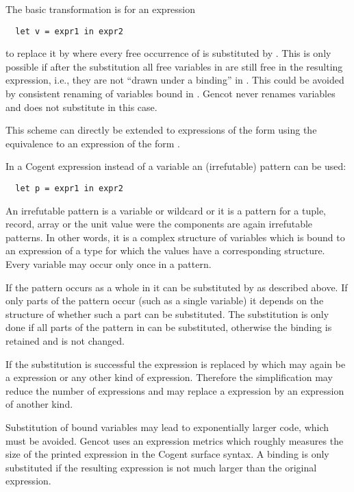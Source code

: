 The basic transformation is for an expression
\begin{verbatim}
  let v = expr1 in expr2
\end{verbatim}
to replace it by  where every free occurrence of  is substituted by . This is only 
possible if after the substitution all free variables in  are still free in the resulting expression, i.e., 
they are not ``drawn under a binding'' in . This could be avoided by consistent renaming of variables bound in 
. Gencot never renames variables and does not substitute in this case.

This scheme can directly be extended to expressions of the form  using the
equivalence to an expression of the form .

In a Cogent  expression instead of a variable  an (irrefutable) pattern  can be used:
\begin{verbatim}
  let p = expr1 in expr2
\end{verbatim}
An irrefutable pattern
is a variable or wildcard or it is a pattern for a tuple, record, array or the unit value were the components are again
irrefutable patterns. In other words, it is a complex structure of variables which is bound to an expression 
of a type for which the values have a corresponding structure. Every variable may occur only once in a pattern.

If the pattern occurs as a whole in  it can be
substituted by  as described above. If only parts of the pattern occur (such as a single variable) it depends
on the structure of  whether such a part can be substituted. The substitution is only done if all parts of the 
pattern in  can be substituted, otherwise the binding is retained and  is not changed.

If the substitution is successful the  expression is replaced by  which may again be a 
expression or any other kind of expression. Therefore the simplification may reduce the number of  expressions
and may replace a  expression by an expression of another kind.

Substitution of bound variables may lead to exponentially larger code, which must be avoided. Gencot uses an expression metrics
which roughly measures the size of the printed expression in the Cogent surface syntax. A binding is only substituted if the 
resulting expression is not much larger than the original expression.

